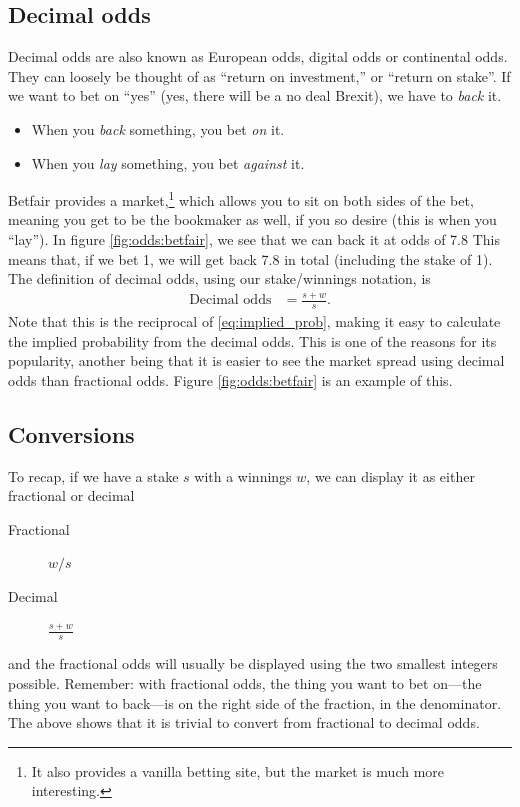 \documentclass[a4paper]{article}
\begin{document}
\subsection{Decimal odds}
Decimal odds are also known as European odds, digital odds or continental odds.
They can loosely be thought of as ``return on investment,'' or ``return on stake''.
If we want to bet on ``yes'' (yes, there will be a no deal Brexit), we have to \emph{back} it.
\begin{itemize}
 \item When you \emph{back} something, you bet \emph{on} it.
 \item When you \emph{lay} something, you bet \emph{against} it.
\end{itemize}
Betfair provides a market,\footnote{It also provides a vanilla betting site, but the market is much more interesting.} which allows you to sit on both sides of the bet, meaning you get to be the bookmaker as well, if you so desire (this is when you ``lay'').
In figure \ref{fig:odds:betfair}, we see that we can back it at odds of 7.8
This means that, if we bet 1, we will get back 7.8 in total (including the stake of 1).
The definition of decimal odds, using our stake/winnings notation, is
\begin{align*}
 \text{Decimal odds} &=
\frac{s + w}{s}
\text{.}
\end{align*}
Note that this is the reciprocal of \eqref{eq:implied_prob}, making it easy to calculate the implied probability from the decimal odds.
This is one of the reasons for its popularity, another being that it is easier to see the market spread using decimal odds than fractional odds.
Figure \ref{fig:odds:betfair} is an example of this.

\subsection{Conversions}

To recap, if we have a stake $s$ with a winnings $w$, we can display it as either fractional or decimal
\begin{description}
 \item[Fractional] $w/s$
 \item[Decimal]    $\displaystyle \frac{s + w}{s}$
\end{description}
and the fractional odds will usually be displayed using the two smallest integers possible.
Remember: with fractional odds, the thing you want to bet on---the thing you want to back---is on the right side of the fraction, in the denominator.
The above shows that it is trivial to convert from fractional to decimal odds.
\end{document}
